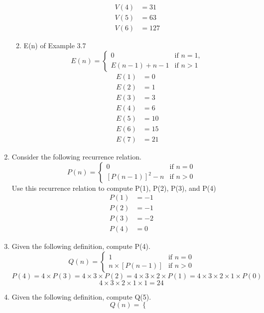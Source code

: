 \documentclass[12pt]{article}
\begin{document}
\begin{enumerate}
\begin{enumerate}
\begin{align*}
            V(4) &= 31\\
            V(5) &= 63\\
            V(6) &= 127
        \end{align*}
        \item E(n) of Example 3.7
        \[
        E(n) = 
        \begin{cases} 
        0 &     \text{if } n = 1, \\
        E(n-1) + n - 1 & \text{if } n > 1 
        \end{cases}
        \]
        \begin{align*}
            E(1) &= 0\\
            E(2) &= 1\\
            E(3) &= 3\\
            E(4) &= 6\\
            E(5) &= 10\\
            E(6) &= 15\\
            E(7) &= 21
        \end{align*}
    \end{enumerate}
    \item Consider the following recurrence relation.
    \[
    P(n) = 
    \begin{cases} 
    0 &     \text{if } n = 0 \\
    [P(n-1)]^2 - n  & \text{if } n > 0 
    \end{cases}
    \]
    Use this recurrence relation to compute P(1), P(2), P(3), and P(4)
    \begin{align*}
        P(1) &= -1\\
        P(2) &= -1\\
        P(3) &= -2\\
        P(4) &= 0
    \end{align*}
    \item Given the following definition, compute P(4).
    \[
    Q(n) = 
    \begin{cases} 
    1 &     \text{if } n = 0 \\
    n\times [P(n - 1)] & \text{if } n > 0
    \end{cases}
    \]
    \[P(4) = 4 \times P(3) = 4 \times 3 \times P(2) = 4 \times 3 \times 2 \times P(1) = 4 \times 3 \times 2 \times 1 \times P(0)\]
    \[4 \times 3 \times 2 \times 1 \times 1 = 24\]
    \item Given the following definition, compute Q(5).
    \[
    Q(n) = 
    \begin{cases} 

\end{cases}\]
\end{enumerate}
\end{document}
